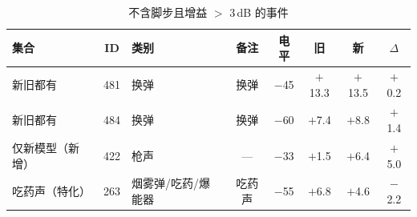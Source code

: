 \begin{table}[htbp]\centering
\caption{不含脚步且增益 $>$ 3\,dB 的事件}\label{tab:nm_boosted}
{\footnotesize\begin{threeparttable}
\begin{tabular}{lclccccc}\toprule
集合 & ID & 类别 & 备注 & 电平 & 旧 & 新 & $\Delta$ \\
\midrule
新旧都有 & 481 & 换弹 & 换弹 & $-$45 & $+$13.3 & $+$13.5 & $+$0.2 \\
新旧都有 & 484 & 换弹 & 换弹 & $-$60 & $+$7.4 & $+$8.8 & $+$1.4 \\
仅新模型（新增） & 422 & 枪声 & — & $-$33 & $+$1.5 & $+$6.4 & $+$5.0 \\
吃药声（特化） & 263 & 烟雾弹/吃药/爆能器 & 吃药声 & $-$55 & $+$6.8 & $+$4.6 & $-$2.2 \\
\bottomrule\end{tabular}
\end{threeparttable}}
\end{table}
